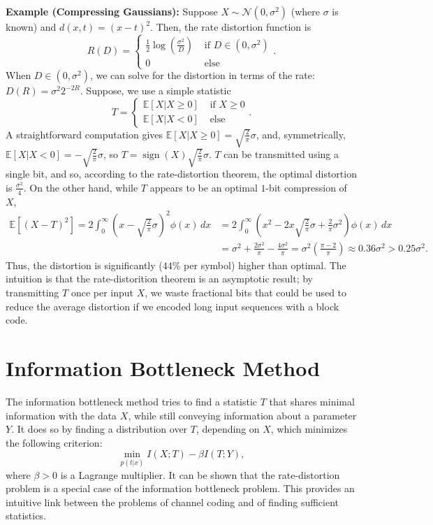 \documentclass[twoside]{article}
\newcommand\E{\mathbb{E}}       %
\newcommand\sgn{\operatorname{sign}}
\begin{document}
{\bf Example (Compressing Gaussians):} Suppose $X \sim
\mathcal{N}(0,\sigma^2)$ (where $\sigma$ is known) and $d(x,t) = (x - t)^2$.
Then, the rate distortion function is
\[R(D) = \left\{
            \begin{array}{ll}
                \frac{1}{2} \log \left( \frac{\sigma^2}{D} \right)
                                            & \mbox{ if } D \in (0,\sigma^2) \\
                0 & \mbox{ else }
            \end{array}
    \right..
\]
When $D \in (0,\sigma^2)$, we can solve for the distortion in terms of the
rate: $D(R) = \sigma^2 2^{-2R}$. Suppose, we use a simple statistic
\[T = \left\{
        \begin{array}{ll}
            \E[X | X \geq 0] & \mbox{ if } X \geq 0 \\
            \E[X | X < 0] & \mbox{ else }
        \end{array}
    \right..\]
A straightforward computation gives
$\E[X | X \geq 0] = \sqrt{\frac{2}{\pi}}\sigma$, and, symmetrically,
$\E[X | X < 0] = -\sqrt{\frac{2}{\pi}}\sigma$, so $T =
\sgn(X)\sqrt{\frac{2}{\pi}}\sigma$.
$T$ can be transmitted using a single bit, and so, according to the
rate-distortion theorem, the optimal distortion is $\frac{\sigma^2}{4}$. On the
other hand, while $T$ appears to be an optimal $1$-bit compression of $X$,
\begin{align*}
\E[(X - T)^2]
    = 2\int_0^\infty \left( x - \sqrt{\frac{2}{\pi}}\sigma \right)^2 \phi(x) \, dx
 &  = 2\int_0^\infty \left( x^2 - 2x\sqrt{\frac{2}{\pi}}\sigma + \frac{2}{\pi}\sigma^2 \right) \phi(x) \, dx    \\
 &  = \sigma^2 + \frac{2\sigma^2}{\pi} - \frac{4\sigma^2}{\pi}
    = \sigma^2 \left( \frac{\pi - 2}{\pi} \right)
    \approx 0.36 \sigma^2 > 0.25\sigma^2.
\end{align*}
Thus, the distortion is significantly ($44\%$ per symbol) higher than optimal.
The intuition is that the rate-distorition theorem is an asymptotic result;
by transmitting $T$ once per input $X$, we waste fractional bits that could be
used to reduce the average distortion if we encoded long input sequences with a
block code.

\section{Information Bottleneck Method}
The information bottleneck method tries to find a statistic $T$ that shares
minimal information with the data $X$, while still conveying information about
a parameter $Y$. It does so by finding a distribution over $T$, depending on
$X$, which minimizes the following criterion:
\[\min_{p(t|x)} I(X;T) - \beta I(T;Y),\]
where $\beta > 0$ is a Lagrange multiplier. It can be shown that the
rate-distortion problem is a special case of the information bottleneck
problem. This provides an intuitive link between the problems of channel coding
and of finding sufficient statistics.
\end{document}
